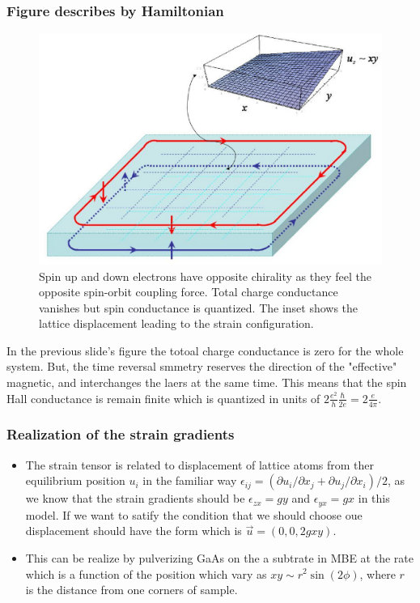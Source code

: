 \documentclass{beamer}
\begin{document}
\begin{frame}
  \frametitle{Figure describes by Hamiltonian}
  \begin{figure}[htpb]
  \includegraphics[scale=0.35]{edgecurrent.eps}
  \caption{Spin up and down electrons have opposite chirality as
they feel the opposite spin-orbit coupling force. Total charge
conductance vanishes but spin conductance is quantized. The inset
shows the lattice displacement leading to the strain
configuration.}
 \label{fig:edgecurrent}
  \end{figure} 
\end{frame}

\begin{frame}
In the previous slide's figure the totoal charge conductance is zero for 
the whole system. But, the time reversal smmetry reserves the direction of 
the "effective" magnetic, and interchanges the laers at the same time. 
This means that the spin Hall conductance is remain finite which is 
quantized in units of $2 \frac{e^2}{h} \frac{\hbar}{2e}=2\frac{e}{4\pi}$.

\end{frame}

\begin{frame}
  \frametitle{Realization of the strain gradients} 
  \begin{itemize}
\item The strain tensor is related to displacement of lattice atoms from ther
equilibrium position $u_i$ in the familiar way $\epsilon_{ij} = (\partial u_i
/\partial x_j + \partial u_j /\partial x_i)/2$, as we know that the strain
gradients should be $\epsilon_{zx} = g y$ and $\epsilon_{yx} = g x$ in this
model. If we want to satify the condition that we should choose oue
displacement should have the form which is $\vec{u} = (0,0, 2 g x y)$.

\item This can be realize by pulverizing GaAs on the a subtrate in MBE at
the rate which is a function of the position which vary as 
$xy \sim r^2 \sin(2\phi)$, where $r$ is the distance from one corners of
sample. 

\end{itemize}
\end{frame}
\end{document}

